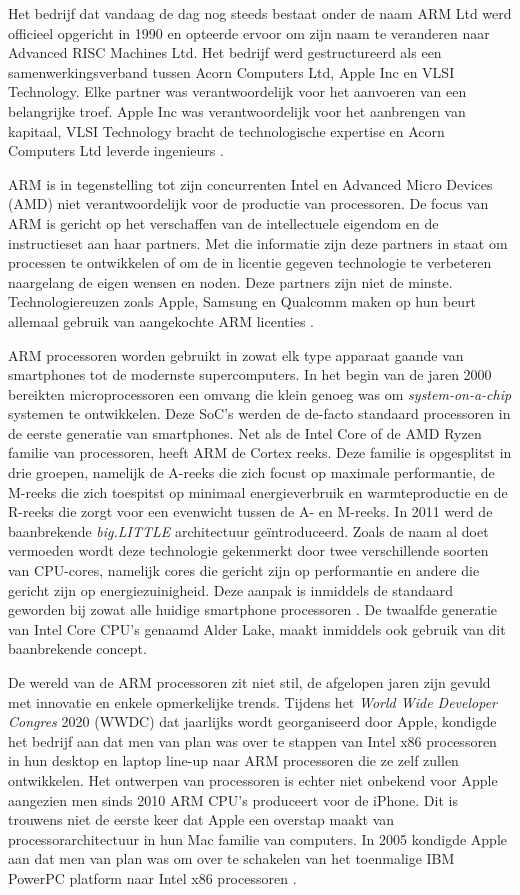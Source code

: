Het bedrijf dat vandaag de dag nog steeds bestaat onder de naam ARM Ltd werd officieel opgericht in 1990 en opteerde ervoor om zijn naam te veranderen naar Advanced RISC Machines Ltd. Het bedrijf werd gestructureerd als een samenwerkingsverband tussen Acorn Computers Ltd, Apple Inc en VLSI Technology. Elke partner was verantwoordelijk voor het aanvoeren van een belangrijke troef. Apple Inc was verantwoordelijk voor het aanbrengen van kapitaal, VLSI Technology bracht de technologische expertise en Acorn Computers Ltd leverde ingenieurs \autocite{Walshe2015}.

ARM is in tegenstelling tot zijn concurrenten Intel en Advanced Micro Devices (AMD) niet verantwoordelijk voor de productie van processoren. De focus van ARM is gericht op het verschaffen van de intellectuele eigendom en de instructieset aan haar partners. Met die informatie zijn deze partners in staat om processen te ontwikkelen of om de in licentie gegeven technologie te verbeteren naargelang de eigen wensen en noden. Deze partners zijn niet de minste. Technologiereuzen zoals Apple, Samsung en Qualcomm maken op hun beurt allemaal gebruik van aangekochte ARM licenties \autocite{Ahammed2017}.

ARM processoren worden gebruikt in zowat elk type apparaat gaande van smartphones tot de modernste supercomputers. In het begin van de jaren 2000 bereikten microprocessoren een omvang die klein genoeg was om \textit{system-on-a-chip} systemen te ontwikkelen. Deze SoC’s werden de de-facto standaard processoren in de eerste generatie van smartphones. Net als de Intel Core of de AMD Ryzen familie van processoren, heeft ARM de Cortex reeks. Deze familie is opgesplitst in drie groepen, namelijk de A-reeks die zich focust op maximale performantie, de M-reeks die zich toespitst op minimaal energieverbruik en warmteproductie en de R-reeks die zorgt voor een evenwicht tussen de A- en M-reeks. In 2011 werd de baanbrekende \textit{big.LITTLE} architectuur geïntroduceerd. Zoals de naam al doet vermoeden wordt deze technologie gekenmerkt door twee verschillende soorten van CPU-cores, namelijk cores die gericht zijn op performantie en andere die gericht zijn op energiezuinigheid. Deze aanpak is inmiddels de standaard geworden bij zowat alle huidige smartphone processoren \autocite{Walshe2015a}. De twaalfde generatie van Intel Core CPU’s genaamd Alder Lake, maakt inmiddels ook gebruik van dit baanbrekende concept.

De wereld van de ARM processoren zit niet stil, de afgelopen jaren zijn gevuld met innovatie en enkele opmerkelijke trends. Tijdens het \textit{World Wide Developer Congres} 2020 (WWDC) dat jaarlijks wordt georganiseerd door Apple, kondigde het bedrijf aan dat men van plan was over te stappen van Intel x86 processoren in hun desktop en laptop line-up naar ARM processoren die ze zelf zullen ontwikkelen. Het ontwerpen van processoren is echter niet onbekend voor Apple aangezien men sinds 2010 ARM CPU’s produceert voor de iPhone. Dit is trouwens niet de eerste keer dat Apple een overstap maakt van processorarchitectuur in hun Mac familie van computers. In 2005 kondigde Apple aan dat men van plan was om over te schakelen van het toenmalige IBM PowerPC platform naar Intel x86 processoren \autocite{Fulton2020}. 

